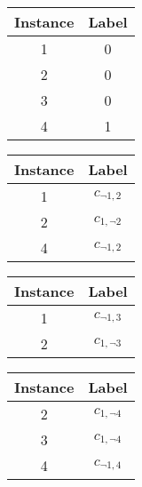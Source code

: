 \documentclass[Dissertation.tex]{subfiles}
\begin{document}
\begin{table}[]
\begin{subfigure}{1\linewidth}
\begin{subfigure}{0.2\linewidth}
			\end{subfigure}
			\quad
			\begin{subfigure}{0.2\linewidth}
				\begin{tabular*}{1\linewidth}{@{}cc@{}}
					\toprule
					Instance & Label \\ \midrule
					1	&	0        \\
					2	&	0        \\
					3	&	0        \\
					4	&	1        \\ \bottomrule
				\end{tabular*}
			\end{subfigure}
		\end{subfigure}

\vspace{3.5em}
	\begin{subfigure}{1\linewidth}
	\centering
	\begin{subfigure}[t]{0.2\linewidth}
		\begin{tabular*}{1\linewidth}{@{}cc@{}}
			\toprule
			Instance & Label \\ \midrule
			1	&	$ c_{\neg1,2} $ 	       \\
			2	&	$ c_{1,\neg2} $        \\
			4	&   $ c_{\neg1,2} $	    \\ \bottomrule
		\end{tabular*}
	\end{subfigure}
	\quad
	\begin{subfigure}[t]{0.2\linewidth}
		\begin{tabular*}{1\linewidth}{@{}cc@{}}
			\toprule
			Instance & Label \\ \midrule
			1	&	$ c_{\neg1,3} $ 	       \\
			2	&	$ c_{1,\neg3} $        \\ \bottomrule

		\end{tabular*}
	\end{subfigure}
	\quad
	\begin{subfigure}[t]{0.2\linewidth}
		\begin{tabular*}{1\linewidth}{@{}cc@{}}
			\toprule
			Instance & Label \\ \midrule
			2	&	$ c_{1,\neg4} $        \\
			3	&	$ c_{1,\neg4} $        \\
			4	&   $ c_{\neg1,4} $	    \\ \bottomrule
		\end{tabular*}
	\end{subfigure}


\end{subfigure}
\end{table}
\end{document}
